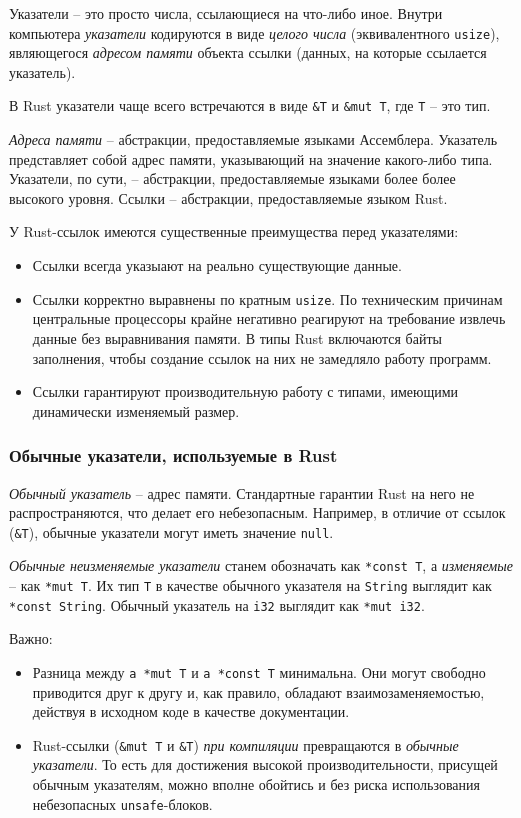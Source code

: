 \documentclass[%
	11pt,
	a4paper,
	utf8,
		]{article}
\begin{document}
Указатели -- это просто числа, ссылающиеся на что-либо иное. Внутри компьютера \emph{указатели} кодируются в виде \emph{целого числа} (эквивалентного \verb|usize|), являющегося \emph{адресом памяти} объекта ссылки (данных, на которые ссылается указатель).

В Rust указатели чаще всего встречаются в виде \verb|&T| и \verb|&mut T|, где \verb|T| -- это тип.

\emph{Адреса памяти} -- абстракции, предоставляемые языками Ассемблера. Указатель представляет собой адрес памяти, указывающий на значение какого-либо типа. Указатели, по сути, -- абстракции, предоставляемые языками более более высокого уровня. Ссылки -- абстракции, предоставляемые языком Rust.

У Rust-ссылок имеются существенные преимущества перед указателями:
\begin{itemize}
	\item {\color{blue}Ссылки всегда указыают на реально существующие данные}. 
	
	\item Ссылки корректно выравнены по кратным \verb|usize|. По техническим причинам центральные процессоры крайне негативно реагируют на требование извлечь данные без выравнивания памяти. В типы Rust включаются байты заполнения, чтобы создание ссылок на них не замедляло работу программ.
	
	\item Ссылки гарантируют производительную работу с типами, имеющими динамически изменяемый размер.
\end{itemize}

\subsubsection{Обычные указатели, используемые в Rust}

\emph{Обычный указатель} -- адрес памяти. Стандартные гарантии Rust на него не распространяются, что делает его небезопасным. Например, в отличие от ссылок (\verb|&T|), обычные указатели могут иметь значение \verb|null|.

\emph{Обычные неизменяемые указатели} станем обозначать как \verb|*const T|, а \emph{изменяемые} -- как \verb|*mut T|. Их тип \verb|T| в качестве обычного указателя на \verb|String| выглядит как \verb|*const String|. Обычный указатель на \verb|i32| выглядит как \verb|*mut i32|.

Важно:
\begin{itemize}
	\item {\color{blue}Разница между \verb|a *mut T| и \verb|a *const T| минимальна}. Они могут свободно приводится друг к другу и, как правило, обладают взаимозаменяемостью, действуя в исходном коде в качестве документации.
	
	\item {\color{blue}Rust-ссылки (\verb|&mut T| и \verb|&T|) \emph{при компиляции} превращаются в \emph{обычные указатели}}. То есть для достижения высокой производительности, присущей обычным указателям, можно вполне обойтись и без риска использования небезопасных \verb|unsafe|-блоков.
\end{itemize}
\end{document}
